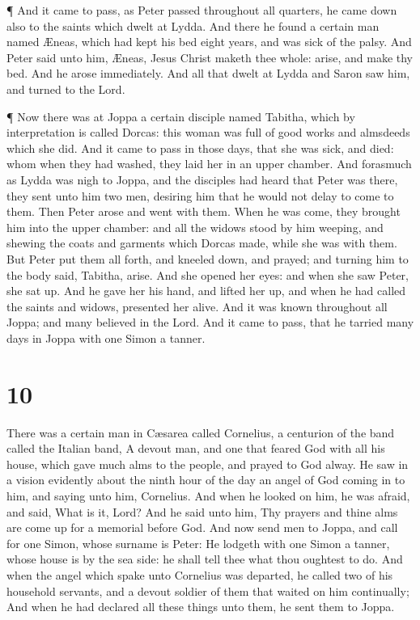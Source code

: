  ¶ And it came to pass, as Peter passed throughout all
quarters, he came down also to the saints which dwelt at Lydda.
 And there he found a certain man named Æneas, which had
kept his bed eight years, and was sick of the palsy.  And
Peter said unto him, Æneas, Jesus Christ maketh thee whole: arise, and
make thy bed. And he arose immediately.  And all that dwelt
at Lydda and Saron saw him, and turned to the Lord.

 ¶ Now there was at Joppa a certain disciple named Tabitha,
which by interpretation is called Dorcas: this woman was full of good
works and almsdeeds which she did.  And it came to pass in
those days, that she was sick, and died: whom when they had washed, they
laid her in an upper chamber.  And forasmuch as Lydda was
nigh to Joppa, and the disciples had heard that Peter was there, they
sent unto him two men, desiring him that he would not delay to come to
them.  Then Peter arose and went with them. When he was
come, they brought him into the upper chamber: and all the widows stood
by him weeping, and shewing the coats and garments which Dorcas made,
while she was with them.  But Peter put them all forth, and
kneeled down, and prayed; and turning him to the body said, Tabitha,
arise. And she opened her eyes: and when she saw Peter, she sat up.
 And he gave her his hand, and lifted her up, and when he
had called the saints and widows, presented her alive.  And
it was known throughout all Joppa; and many believed in the Lord.
 And it came to pass, that he tarried many days in Joppa
with one Simon a tanner.

\hypertarget{section-9}{%
\section{10}\label{section-9}}

 There was a certain man in Cæsarea called Cornelius, a
centurion of the band called the Italian band,  A devout
man, and one that feared God with all his house, which gave much alms to
the people, and prayed to God alway.  He saw in a vision
evidently about the ninth hour of the day an angel of God coming in to
him, and saying unto him, Cornelius.  And when he looked on
him, he was afraid, and said, What is it, Lord? And he said unto him,
Thy prayers and thine alms are come up for a memorial before God.
 And now send men to Joppa, and call for one Simon, whose
surname is Peter:  He lodgeth with one Simon a tanner, whose
house is by the sea side: he shall tell thee what thou oughtest to do.
 And when the angel which spake unto Cornelius was departed,
he called two of his household servants, and a devout soldier of them
that waited on him continually;  And when he had declared
all these things unto them, he sent them to Joppa.

